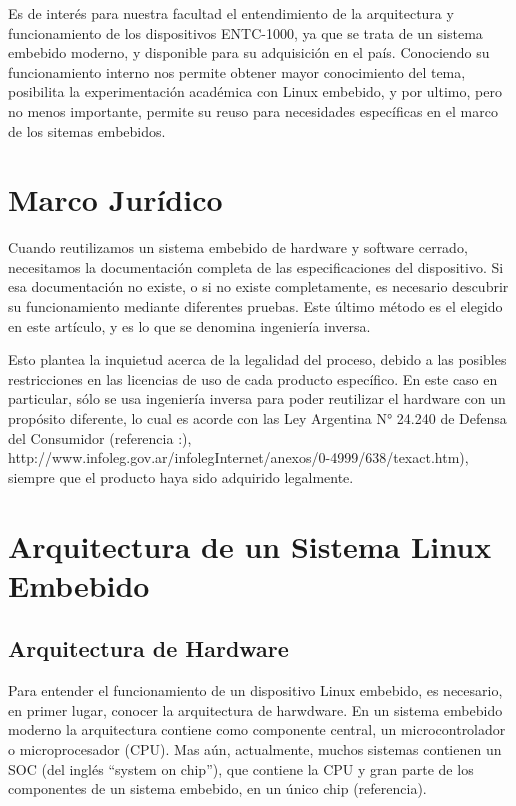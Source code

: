 \documentclass[conference]{IEEEtran}
\begin{document}
Es de interés para nuestra facultad el entendimiento de la arquitectura y funcionamiento
de los dispositivos ENTC-1000,
ya que se trata de un sistema embebido moderno, y disponible
para su adquisición en el país. Conociendo su funcionamiento interno
nos permite obtener mayor conocimiento del tema,
posibilita la experimentación académica con Linux embebido, y
por ultimo, pero no menos importante, permite su reuso para necesidades
específicas en el marco de los sitemas embebidos.


\section{Marco Jurídico}


Cuando reutilizamos un sistema embebido de hardware y software cerrado, necesitamos la
documentación completa de las especificaciones del dispositivo.
Si esa documentación no existe, o si no existe
completamente, es necesario descubrir su funcionamiento mediante
diferentes pruebas. Este último método es el elegido en este artículo, y es lo que 
se denomina ingeniería inversa.

Esto plantea la inquietud acerca de la legalidad 
del proceso, debido a las posibles restricciones en las licencias de uso de cada producto
específico. En este caso en particular, sólo se usa ingeniería inversa para poder
reutilizar el hardware con un propósito diferente, lo cual es acorde con las Ley
Argentina N° 24.240 de Defensa del Consumidor (referencia :),
http://www.infoleg.gov.ar/infolegInternet/anexos/0-4999/638/texact.htm),
siempre que el producto haya sido adquirido legalmente.  





\section{Arquitectura de un Sistema Linux Embebido}

\subsection{Arquitectura de Hardware}

Para entender el funcionamiento de un dispositivo Linux embebido, es necesario, en primer lugar, conocer
la arquitectura de harwdware. En un sistema embebido moderno la arquitectura
contiene como componente central, un microcontrolador o microprocesador (CPU).
Mas aún, actualmente, muchos sistemas contienen un SOC (del inglés ``system on chip''),
que contiene la CPU y gran parte de los componentes de un sistema embebido, en un
único chip (referencia).
\end{document}
